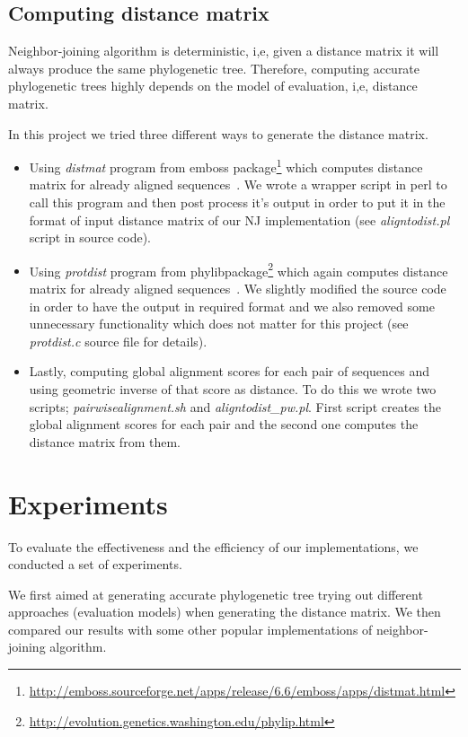 \documentclass[11pt,letterpaper]{article}
\theoremstyle{definition}
\begin{document}
\subsection{Computing distance matrix}\label{distance}

Neighbor-joining algorithm is deterministic, i,e, given a distance matrix it will always produce the same phylogenetic tree. Therefore, computing accurate phylogenetic trees highly depends on the model of evaluation, i,e, distance matrix.

In this project we tried three different ways to generate the distance matrix.
\begin{itemize}
	\item Using \textit{distmat} program from emboss package\footnote{\url{http://emboss.sourceforge.net/apps/release/6.6/emboss/apps/distmat.html}} which computes distance matrix for already aligned sequences~\cite{rice2000emboss}. We wrote a wrapper script in perl to call this program and then post process it's output in order to put it in the format of input distance matrix of our NJ implementation (see \textit{aligntodist.pl} script in source code).
	\item Using \textit{protdist} program from phylibpackage\footnote{\url{http://evolution.genetics.washington.edu/phylip.html}} which again computes  distance matrix for already aligned sequences~\cite{plotree1989phylip}. We slightly modified the source code in order to have the output in required format and we also removed some unnecessary functionality which does not matter for this project (see \textit{protdist.c} source file for details).
	\item Lastly, computing global alignment scores for each pair of sequences and using geometric inverse of that score as distance. To do this we wrote two scripts; \textit{pairwisealignment.sh} and \textit{aligntodist\_pw.pl}. First script creates the global alignment scores for each pair and the second one computes the distance matrix from them.
\end{itemize}

\section{Experiments}

To evaluate the effectiveness and the efficiency of our implementations, we conducted a set of experiments. 

We first aimed at generating accurate phylogenetic tree trying out different approaches (evaluation models) when generating the distance matrix. We then compared our results with some other popular implementations of neighbor-joining algorithm. 
\end{document}
